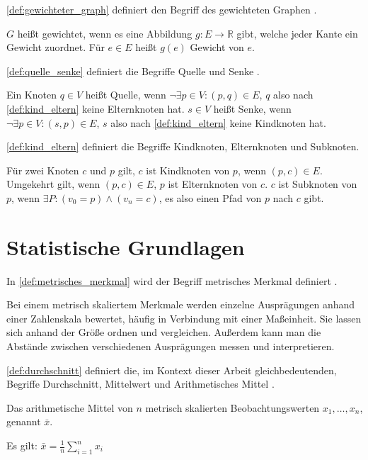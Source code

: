 \autoref{def:gewichteter_graph} definiert den Begriff des gewichteten Graphen
\autocite[Vgl.][S.253]{AlgorithmenUndDatenstrukturen}.
\begin{definition}
    $G$ heißt gewichtet, wenn es eine Abbildung $g:E\rightarrow \mathbb{R}$
    gibt, welche jeder Kante ein Gewicht zuordnet. Für $e\in E$ heißt $g(e)$
    Gewicht von $e$.
    \label{def:gewichteter_graph}
\end{definition}

\autoref{def:quelle_senke} definiert die Begriffe Quelle und Senke
\autocite[Vgl.][S.306]{AlgorithmenUndDatenstrukturen}.
\begin{definition}
    Ein Knoten $q \in V$ heißt Quelle, wenn $ \neg \exists p \in V: (p,q) \in E
    $, $q$ also nach \autoref{def:kind_eltern} keine Elternknoten hat.
    $s \in V$ heißt Senke, wenn $ \neg \exists p \in V: (s,p) \in E $, $s$ also
    nach \autoref{def:kind_eltern} keine Kindknoten hat.
    \label{def:quelle_senke}
\end{definition}

\autoref{def:kind_eltern} definiert die Begriffe Kindknoten, Elternknoten und
Subknoten.
\begin{definition}
    Für zwei Knoten $c$ und $p$ gilt, $c$ ist Kindknoten von $p$, wenn $(p,c)\in E$.
    Umgekehrt gilt, wenn $(p,c)\in E$, $p$ ist Elternknoten von $c$.
    $c$ ist Subknoten von $p$, wenn $\exists P: (v_0=p) \land (v_n=c)$, es also
    einen Pfad von $p$ nach $c$ gibt.
    \label{def:kind_eltern}
\end{definition}

\section{Statistische Grundlagen}
\label{sec:statistische_grundlagen}
In \autoref{def:metrisches_merkmal} wird der Begriff metrisches Merkmal
definiert  \autocite[Vgl.][S.24]{Statistik}.
\begin{definition}
    Bei einem metrisch skaliertem Merkmale werden einzelne Ausprägungen anhand
    einer Zahlenskala bewertet, häufig in Verbindung mit einer Maßeinheit. Sie
    lassen sich anhand der Größe ordnen und vergleichen. Außerdem kann man die
    Abstände zwischen verschiedenen Ausprägungen messen und interpretieren.
    \label{def:metrisches_merkmal}
\end{definition}

\autoref{def:durchschnitt} definiert die, im Kontext dieser Arbeit gleichbedeutenden, Begriffe
Durchschnitt, Mittelwert und Arithmetisches Mittel \autocite[Vgl.][S.52f]{Statistik}.
\begin{definition}
    Das arithmetische Mittel von $n$ metrisch skalierten Beobachtungswerten
    $x_1,\dots,x_n$, genannt $\bar{x}$. 

    Es gilt: $\bar{x} = \frac{1}{n} \displaystyle\sum^{n}_{i=1}x_i$

    \label{def:durchschnitt}
\end{definition}

